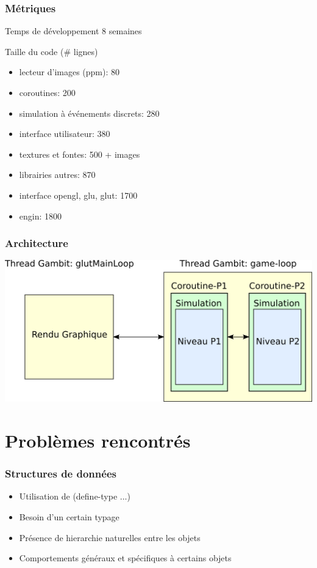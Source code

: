 \documentclass{beamer}
\newcommand{\<}[1]{\`#1}
\begin{document}
\begin{frame}
  \frametitle{Métriques}

  \begin{block}{Temps de développement}
    8 semaines
  \end{block}

  \begin{block}{Taille du code (\# lignes)}
    \begin{itemize}
    \item lecteur d'images (ppm): 80
    \item coroutines: 200
    \item simulation à événements discrets: 280
    \item interface utilisateur: 380
    \item textures et fontes: 500 + images
    \item librairies autres: 870
    \item interface opengl, glu, glut: 1700
    \item \alert{engin: 1800}
    \end{itemize}
  \end{block}
\end{frame}

\begin{frame}
  \frametitle{Architecture}
  \includegraphics[scale=0.7]{arch}
\end{frame}



\section{Problèmes rencontrés}

\begin{frame}
  \frametitle{Structures de données}

  \begin{itemize}
    \item Utilisation de (define-type ...)
    \item Besoin d'un certain \alert{typage}
    \item Présence de hierarchie naturelles entre les objets
    \item Comportements généraux et spécifiques à certains objets
  \end{itemize}
\end{frame}
\end{document}
